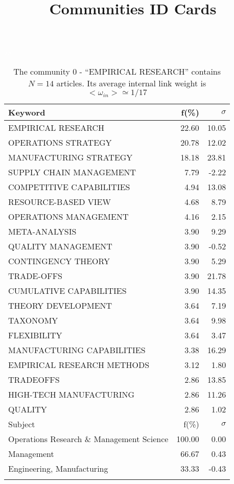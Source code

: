 \documentclass[a4paper,11pt]{report}
\title{{\bf Communities ID Cards}}
\date{\begin{flushleft}This document gather the ``ID Cards'' of the CC communities found within your database.\\
 The CC network was built by keeping a link between articles sharing at least 10 references. The communities characterized here correspond to the ones found in the level 1 (in the sense of the Louvain algo) which gathers more than 0 articles.\\
 These ID cards displays the most frequent keywords, subject categories, journals of publication, institution, countries, authors, references and reference journals of the articles of each community. The significance of an item $\sigma = \sqrt{N} (f - p) / \sqrt{p(1-p)}$ [where $N$ is the number of articles within the community and $f$ and $p$ are the proportion of articles respectively within the community and within the database displaying that item ] is also given (for example $\sigma > 5$ is really highly significant).\\
\vspace{1cm}
\copyright Sebastian Grauwin, Liu Weizhi - (2014) \end{flushleft}}
\begin{document}
\begin{landscape}
\maketitle
\clearpage

\begin{table}[!ht]
\caption{The community 0 - ``EMPIRICAL RESEARCH'' contains $N = 14$ articles. Its average internal link weight is $<\omega_{in}> \simeq 1/17$ }
\textcolor{white}{aa}\\
{\scriptsize\begin{tabular}{|l r r|}
\hline
Keyword & f(\%) & $\sigma$\\
\hline
EMPIRICAL RESEARCH & 22.60 & 10.05\\
OPERATIONS STRATEGY & 20.78 & 12.02\\
MANUFACTURING STRATEGY & 18.18 & 23.81\\
SUPPLY CHAIN MANAGEMENT & 7.79 & -2.22\\
COMPETITIVE CAPABILITIES & 4.94 & 13.08\\
RESOURCE-BASED VIEW & 4.68 & 8.79\\
OPERATIONS MANAGEMENT & 4.16 & 2.15\\
META-ANALYSIS & 3.90 & 9.29\\
QUALITY MANAGEMENT & 3.90 & -0.52\\
CONTINGENCY THEORY & 3.90 & 5.29\\
TRADE-OFFS & 3.90 & 21.78\\
CUMULATIVE CAPABILITIES & 3.90 & 14.35\\
THEORY DEVELOPMENT & 3.64 & 7.19\\
TAXONOMY & 3.64 & 9.98\\
FLEXIBILITY & 3.64 & 3.47\\
MANUFACTURING CAPABILITIES & 3.38 & 16.29\\
EMPIRICAL RESEARCH METHODS & 3.12 & 1.80\\
TRADEOFFS & 2.86 & 13.85\\
HIGH-TECH MANUFACTURING & 2.86 & 11.26\\
QUALITY & 2.86 & 1.02\\
\hline
\hline
Subject & f(\%) & $\sigma$\\
\hline
Operations Research \& Management Science & 100.00 & 0.00\\
Management & 66.67 & 0.43\\
Engineering, Manufacturing & 33.33 & -0.43\\
 &  & \\

\end{tabular}}
\end{table}
\end{landscape}
\end{document}
